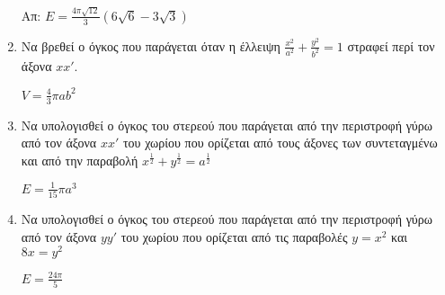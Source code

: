 \documentclass[a4paper,12pt]{article}
\begin{document}
\begin{enumerate}
\hfill Απ: $E=\frac{4\pi\sqrt{12}}{3}(6\sqrt{6}-3\sqrt{3})$

\item Να βρεθεί ο όγκος που παράγεται όταν η έλλειψη $\frac{x^2}{a^2}+\frac{y^2}{b^2}=1$ στραφεί περί τον άξονα $xx'$.

\hfill $V=\frac{4}{3}\pi a b^2$

\item Να υπολογισθεί ο όγκος του στερεού που παράγεται από την περιστροφή γύρω από τον άξονα $xx'$ του χωρίου που ορίζεται από τους άξονες των συντεταγμένω και από την παραβολή $x^{\frac{1}{2}}+y^{\frac{1}{2}}=a^{\frac{1}{2}}$

\hfill $E=\frac{1}{15}\pi a^3$

\item Να υπολογισθεί ο όγκος του στερεού που παράγεται από την περιστροφή γύρω από τον άξονα $yy'$ του χωρίου που ορίζεται από τις παραβολές $y=x^2$ και $8x=y^2$

\hfill $E=\frac{24\pi}{5}$

\end{enumerate}
\end{document}

